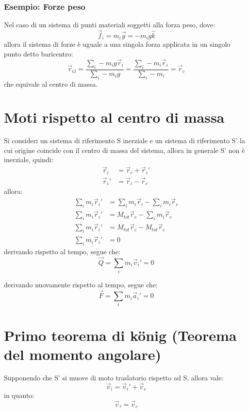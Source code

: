 \documentclass[11pt, a4paper, openright]{book}
\theoremstyle{plain}
\theoremstyle{definition}
\begin{document}
\subsubsection{Esempio: Forze peso}
Nel caso di un sistema di punti materiali soggetti alla forza peso, dove:
\begin{equation}
    \vec{f}_i = m_i \vec{g} = -m_ig\hat{k}
\end{equation}
allora il sistema di forze è uguale a una singola forza applicata in un singolo punto detto baricentro:
\begin{equation}
    \vec{r}_G = \frac{\sum_i - m_ig\vec{r}_i}{\sum_i - m_ig} = \frac{\sum_i - m_i\vec{r}_i}{\sum_i - m_i} = \vec{r}_c
\end{equation}
che equivale al centro di massa.

\section{Moti rispetto al centro di massa}
Si consideri un sistema di riferimento S inerziale e un sistema di riferimento S' la cui origine coincide con il centro di massa del sistema, allora in generale S' non è inerziale, quindi:
\begin{align}
    \vec{r}_i  & = \vec{r}_c + \vec{r}_i' \\
    \vec{r}_i' & = \vec{r}_i - \vec{r}_c
\end{align}
allora:
\begin{align}
    \sum_i m_i \vec{r}_i' & = \sum_i m_i \vec{r}_i - \sum_i m_i\vec{r}_c \\
    \sum_i m_i \vec{r}_i' & = M_{tot}\vec{r}_c - \sum_i m_i\vec{r}_c \\
    \sum_i m_i \vec{r}_i' & = M_{tot}\vec{r}_c - M_{tot}\vec{r}_c \\
    \sum_i m_i \vec{r}_i' & = 0
\end{align}
derivando rispetto al tempo, segue che:
\begin{equation}
    \vec{Q} = \sum_i m_i\vec{v}_i' = 0
\end{equation}

derivando nuovamente rispetto al tempo, segue che:
\begin{equation}
    \vec{F} = \sum_i m_i\vec{a}_i' = 0
\end{equation}

\newpage

\section{Primo teorema di k\"onig (Teorema del momento angolare)}
Supponendo che S' si muove di moto traslatorio rispetto ad S, allora vale:
\begin{equation}
    \vec{v}_i = \vec{v}_i' + \vec{v}_c
\end{equation}
in quanto:
\begin{equation}
    \vec{v}_\tau = \vec{v}_c
\end{equation}
\end{document}
